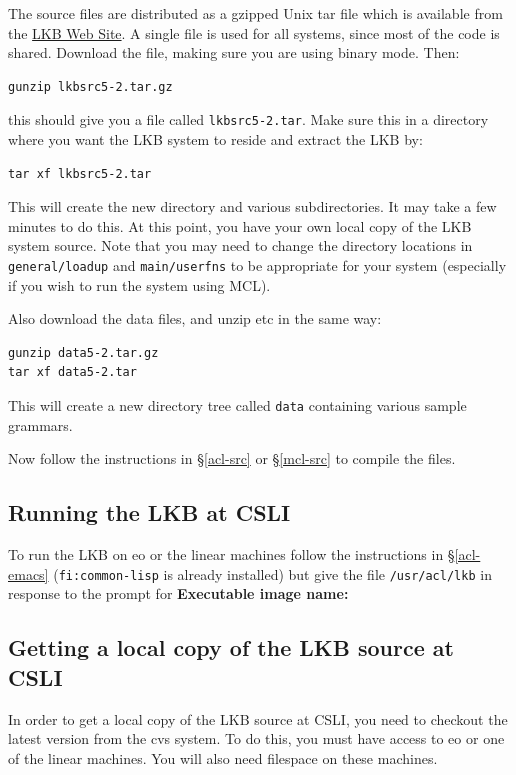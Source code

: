 \documentclass[12pt]{report}
\newcommand{\filename}[1]{{\tt #1}}
\newcommand{\functionname}[1]{{\tt #1}}
\begin{document}
The source files are distributed as a 
gzipped Unix tar file which is available from the
\href{http://www-csli.stanford.edu/~aac/lkb.html}{LKB Web Site}.
A single file is used for all systems, since most of the code is shared.
Download the file, making sure you are using binary mode.
Then:
\begin{verbatim}
gunzip lkbsrc5-2.tar.gz
\end{verbatim}
this should give you a file called \filename{lkbsrc5-2.tar}.  
Make sure this in a directory where you want the LKB system to reside
and extract the LKB by:
\begin{verbatim}
tar xf lkbsrc5-2.tar
\end{verbatim}
This will create the new directory and various subdirectories.
It may take a few minutes to do this.  At this point, you have 
your own local copy of the LKB system source.  Note that
you may need to change the directory locations in \filename{general/loadup}
and \filename{main/userfns}
to be appropriate for your system
(especially if you wish to run the system using MCL).

Also download the data files, and unzip etc in the same way:
\begin{verbatim}
gunzip data5-2.tar.gz
tar xf data5-2.tar
\end{verbatim}
This will create a new directory tree called \filename{data} containing
various sample grammars.

Now follow the instructions in \S\ref{acl-src} or \S\ref{mcl-src}
to compile the files.

\subsection{Running the LKB at CSLI}
\label{run-csli}

To run the LKB on eo or the linear machines
follow the instructions in \S\ref{acl-emacs} 
(\functionname{fi:common-lisp} is already installed)
but give the file \filename{/usr/acl/lkb} 
in response to the prompt for {\bf Executable image name:}

\subsection{Getting a local copy of the LKB source at CSLI}
\label{down-csli}

In order to get a local copy of the LKB source at CSLI, you need to
checkout the latest version from the cvs system.  To do this,
you must have access to eo or one of the linear machines.  
You will also need filespace
on these machines.
\end{document}
